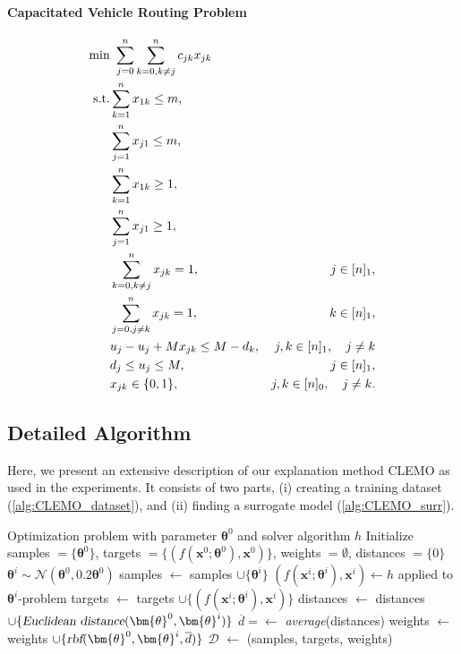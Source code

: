 \documentclass{article}
\theoremstyle{plain}
\theoremstyle{definition}
\theoremstyle{remark}
\begin{document}
\paragraph{Capacitated Vehicle Routing Problem}
\begin{align}\label{eqn:CVRP-app}
 \min &  \ \sum_{j=0}^n\sum_{k=0,k\neq j}^n c_{jk}x_{jk}&\\
 \text{s.t.} & \sum_{k=1}^n x_{1k} \leq m,&\notag\\
  & \sum_{j=1}^n x_{j1} \leq m,&\notag\\
 & \sum_{k=1}^n x_{1k} \geq 1,&\notag\\
 & \sum_{j=1}^n x_{j1} \geq 1,&\notag\\
  & \sum_{k=0, k\neq j}^n x_{jk}=1, &j\in[n]_1,\notag\\
   &\sum_{j=0, j\neq k}^n x_{jk}=1, &k\in[n]_1,\notag\\
   &u_j-u_j+Mx_{jk}\leq M-d_k, &j,k \in[n]_1,\quad j\neq k\notag\\
   &d_j\leq u_j\leq M, &j\in[n]_1,\notag\\
& x_{jk}\in\{0,1\}, &j,k\in[n]_0,\quad j\neq k.\notag
\end{align}

\subsection{Detailed Algorithm}
Here, we present an extensive description of our explanation method CLEMO as used in the experiments. It consists of two parts, (i) creating a training dataset (\cref{alg:CLEMO_dataset}), and (ii) finding a surrogate model (\cref{alg:CLEMO_surr}).
\begin{algorithm}[H]
   \caption{CLEMO - Creating a dataset}
   \label{alg:CLEMO_dataset}
\begin{algorithmic}
    Optimization problem with parameter $\bm{\theta}^0$ and solver algorithm $h$
   \STATE Initialize samples $=\{\bm{\theta}^0\}$, targets $=\{(f(\bm{x}^0;\bm{\theta}^0), \bm{x}^0)\}$, weights $=\emptyset$, distances $=\{0\}$
   \STATE $\bm{\theta}^i \sim \mathcal{N}(\bm{\theta}^0, 0.2\bm{\theta}^0)$
   \STATE samples $\leftarrow$ samples $\cup\{\bm{\theta}^i\}$
   \STATE $(f(\bm{x}^i;\bm{\theta}^i),\bm{x}^i)\leftarrow h$ applied to $\bm{\theta}^i$-problem
   \STATE targets $\leftarrow$ targets $\cup\{(f(\bm{x}^i;\bm{\theta}^i),\bm{x}^i)\}$
   \STATE distances $\leftarrow$ distances $\cup\{\textsl{Euclidean distance}(\bm{\theta}^0,\bm{\theta}^i)\}$
   \ENDIF
   \ENDWHILE
   \STATE $\overline{d}=\leftarrow$ \textsl{average}(distances)
   \STATE weights $\leftarrow$ weights $\cup\{\textsl{rbf}(\bm{\theta}^0, \bm{\theta}^i, \overline{d})\}$
   \ENDFOR
    $\mathcal{D}$ $\leftarrow$ (samples, targets, weights)
\end{algorithmic}
\end{algorithm}
\end{document}

